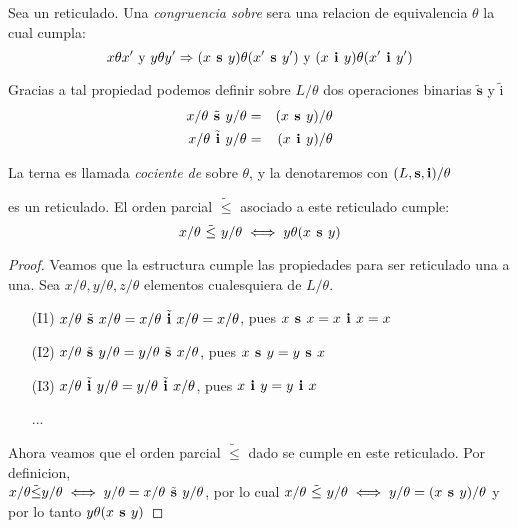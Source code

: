 \begin{definition}
  Sea \reticulAlg un reticulado. Una \emph{congruencia sobre} \reticulAlg sera una relacion de equivalencia
  $\theta$ la cual cumpla:
  $$
  x\theta x' \text{ y } y\theta y' \Rightarrow (x\textbf{ s }y)\theta(x'\textbf{ s }y') \text{ y } (x\textbf{ i }y)\theta(x'\textbf{ i }y')
  $$

  Gracias a tal propiedad podemos definir sobre $L/\theta$ dos operaciones binarias $\tilde{\textbf{s}}$ y $\tilde{\text{i}}$
  \begin{alignat*}{2}
    x/\theta\tilde{\textbf{ s }}y/\theta &=& (x\textbf{ s }y)/\theta\\
    x/\theta\tilde{\textbf{ i }}y/\theta &=& (x\textbf{ i }y)/\theta
  \end{alignat*}
\end{definition}

\begin{definition}
  La terna  es llamada \emph{cociente de} \reticulAlg sobre $\theta$,
  y la denotaremos con $(L, \textbf{s}, \textbf{i})/\theta$
\end{definition}

\begin{lemma}
   es un reticulado. El orden
  parcial $\tilde{\leq}$ asociado a este reticulado cumple:
  $$
  x/\theta\ \tilde{\leq}\  y/\theta \iff y\theta(x\textbf{ s }y)
  $$
\end{lemma}

\begin{proof}
  Veamos que la estructura  cumple las propiedades para ser reticulado una a una.
  Sea $x/\theta, y/\theta, z/\theta$ elementos cualesquiera de $L/\theta$.
  \begin{itemize}
    \item[(I1)] $x/\theta\tilde{\textbf{ s }}x/\theta = x/\theta\tilde{\textbf{ i }}x/\theta = x/\theta$, pues $x\textbf{ s }x = x\textbf{ i }x = x$
    \item[(I2)] $x/\theta\tilde{\textbf{ s }}y/\theta = y/\theta\tilde{\textbf{ s }}x/\theta$, pues $x\textbf{ s }y = y\textbf{ s }x$
    \item[(I3)] $x/\theta\tilde{\textbf{ i }}y/\theta = y/\theta\tilde{\textbf{ i }}x/\theta$, pues $x\textbf{ i }y = y\textbf{ i }x$
    \item[] ... 
  \end{itemize}
  Ahora veamos que el orden parcial $\tilde{\leq}$ dado se cumple en este reticulado. Por definicion, \\$x/\theta \tilde{\leq} y/\theta \iff y/\theta = x/\theta\tilde{\textbf{ s }}y/\theta$,
  por lo cual $x/\theta\ \tilde{\leq}\ y/\theta \iff y/\theta = (x\textbf{ s }y)/\theta$ y por lo tanto $y\theta(x\textbf{ s }y)$
\end{proof}

